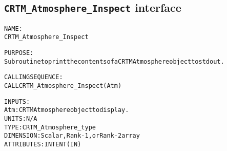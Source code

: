 \subsection{\texttt{CRTM\_Atmosphere\_Inspect} interface}
  \label{sec:CRTM_Atmosphere_Inspect_interface}
  \begin{alltt}
 
  NAME:
        CRTM_Atmosphere_Inspect
 
  PURPOSE:
        Subroutine to print the contents of a CRTM Atmosphere object to stdout.
 
  CALLING SEQUENCE:
        CALL CRTM_Atmosphere_Inspect( Atm )
 
  INPUTS:
        Atm:  CRTM Atmosphere object to display.
              UNITS:      N/A
              TYPE:       CRTM_Atmosphere_type
              DIMENSION:  Scalar, Rank-1, or Rank-2 array
              ATTRIBUTES: INTENT(IN)
 
  \end{alltt}
